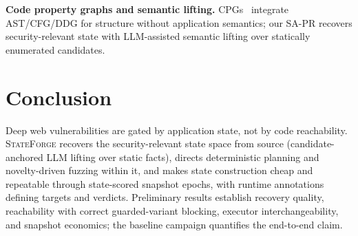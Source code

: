 \documentclass[letterpaper,twocolumn,10pt]{article}
\newcommand{\sys}{\textsc{StateForge}}
\begin{document}
\textbf{Code property graphs and semantic lifting.} CPGs~\cite{yamaguchi} integrate AST/CFG/DDG for structure without application semantics; our SA-PR recovers security-relevant state with LLM-assisted semantic lifting over statically enumerated candidates.

\section{Conclusion}
Deep web vulnerabilities are gated by application state, not by code reachability. \sys{} recovers the security-relevant state space from source (candidate-anchored LLM lifting over static facts), directs deterministic planning and novelty-driven fuzzing within it, and makes state construction cheap and repeatable through state-scored snapshot epochs, with runtime annotations defining targets and verdicts. Preliminary results establish recovery quality, reachability with correct guarded-variant blocking, executor interchangeability, and snapshot economics; the baseline campaign quantifies the end-to-end claim.
\end{document}
